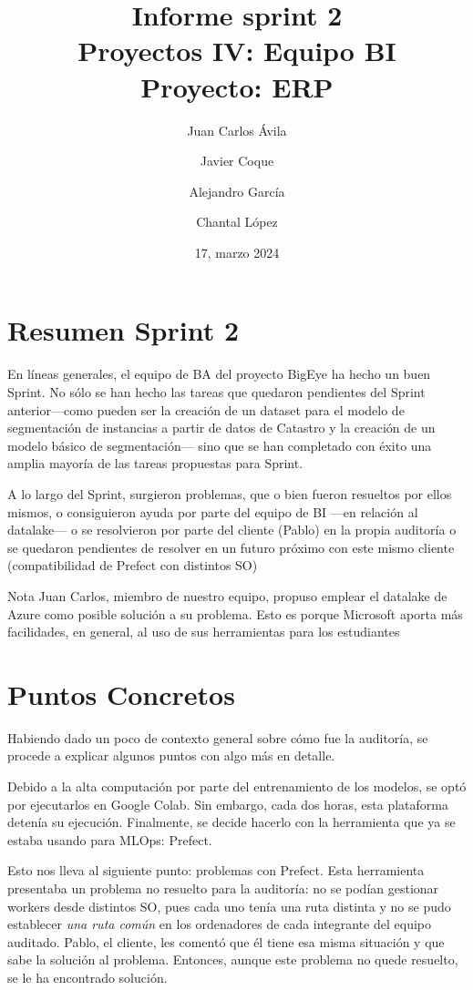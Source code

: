 \documentclass[12pt, a4paper, twoside]{article} %
\title{Informe sprint 2\\
\large Proyectos IV: Equipo BI\\
\large Proyecto: ERP}
\author{
  \small{Juan Carlos Ávila}\fn{juan.avila@live.u-tad.com}
  \and
  \small{Javier Coque}\fn{javier.coque@live-u.tad.com}
  \and
  \small{Alejandro García}\fn{alejandro.gallego@live.u-tad.com}
  \and
  \small{Chantal López}\fn{chantal.lopez@live.u-tad.com}
}
\date{17, marzo 2024}
\newcommand{\ti}{\emph} %
\begin{document}
\maketitle


\pagestyle{plain} %
\setcounter{page}{1}

\section{Resumen Sprint 2}
En líneas generales, el equipo de BA del proyecto BigEye ha hecho un buen Sprint. No sólo se han hecho las tareas que quedaron pendientes del Sprint anterior---como pueden ser la creación de un 
dataset para el modelo de segmentación de instancias a partir de datos de Catastro y la creación de un modelo básico de segmentación--- sino que se han completado con éxito una amplia mayoría de las tareas propuestas para Sprint. 

A lo largo del Sprint, surgieron problemas, que o bien fueron resueltos por ellos mismos, o consiguieron ayuda por parte del equipo de BI ---en relación al datalake--- o se resolvieron por parte del cliente (Pablo) en la propia auditoría o se quedaron pendientes de resolver en un futuro próximo con este mismo cliente (compatibilidad de Prefect con distintos SO)

\begin{ejemplo2}{Nota}
    Juan Carlos, miembro de nuestro equipo, propuso emplear el datalake de Azure como posible solución a su problema. Esto es porque Microsoft aporta más facilidades, en general, al uso de sus herramientas para los estudiantes
\end{ejemplo2}

\section{Puntos Concretos}
Habiendo dado un poco de contexto general sobre cómo fue la auditoría, se procede a explicar algunos puntos con algo más en detalle.

Debido a la alta computación por parte del entrenamiento de los modelos, se optó por ejecutarlos en Google Colab. Sin embargo, cada dos horas, esta plataforma detenía su ejecución. Finalmente, se decide hacerlo con la herramienta que ya se estaba usando para MLOps: Prefect.

Esto nos lleva al siguiente punto: problemas con Prefect. Esta herramienta presentaba un problema no resuelto para la auditoría: no se podían gestionar workers desde distintos SO, pues cada uno tenía una ruta distinta y no se pudo establecer \ti{una ruta común} en los ordenadores de cada integrante del equipo auditado. Pablo, el cliente, les comentó que él tiene esa misma situación y que sabe la solución al problema. Entonces, aunque este problema no quede resuelto, se le ha encontrado solución.
\end{document}

